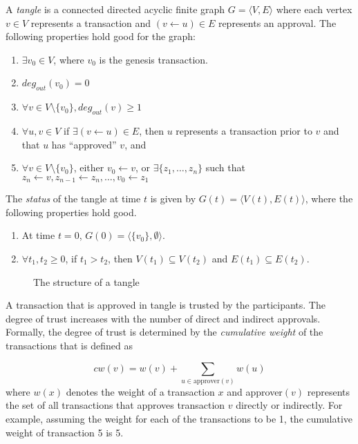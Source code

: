 \begin{definition} [tangle]
	A {\em tangle} is a connected directed acyclic finite graph $G = \langle V,E \rangle$ where each vertex $v \in V$ represents a 
	transaction and $(v \leftarrow u) \in E$ represents an approval. The following properties hold good for the graph: 
	\begin{enumerate}
		\item $\exists v_0 \in V$, where $v_0$ is the genesis transaction.
		\item $deg_{out} (v_0) = 0$ 
		\item $\forall v \in V \setminus \{ v_0 \}, deg_{out} (v) \geq 1$ 
		\item $\forall u,v \in V$ if $\exists (v \leftarrow u)  \in E$, then $u$ represents a transaction prior to $v$  and 
			that $u$ has ``approved'' $v$, and
		\item $\forall v \in V \setminus \{ v_0 \}$, either  $v_0 \leftarrow v$, or 
			$\exists \{z_1, \dots, z_n\}$ such that $z_n \leftarrow v, z_{n-1} \leftarrow z_n, \dots, v_0 \leftarrow z_1$ 
	\end{enumerate}
\end{definition}

The {\em status} of the tangle at time $t$ is given by $G(t) = \langle V(t), E(t) \rangle$, where the following properties hold good.
\begin{enumerate}
	\item At time $t = 0$, $G(0) = \langle \{v_0\}, \emptyset \rangle$.
	\item $\forall t_1,t_2 \geq 0$, if $t_1 > t_2$, then $V(t_1 ) \subseteq V(t_2)$ and $E(t_1) \subseteq E(t_2)$.
\end{enumerate}


\begin{figure} [!htbp]
	\centerline{
	}
	\caption{The structure of a tangle}
	\label{fig:ledger:tangle}
\end{figure}
 
A transaction that is approved in tangle is trusted by the participants. The degree of trust increases with the number of direct
and indirect approvals. Formally, the degree of trust is determined by the {\em cumulative weight} of the transactions that is 
defined as 

\begin{equation}
	cw(v) = w(v) + \sum_{u \in \text{approver}(v)} w(u)
\end{equation}
\noindent
where $w(x)$ denotes the weight of a transaction $x$ and  approver$(v)$ represents the set of all transactions that approves 
transaction $v$ directly or indirectly. For example, assuming the weight for each of the transactions to be 1, the cumulative 
weight of transaction 5 is 5.

